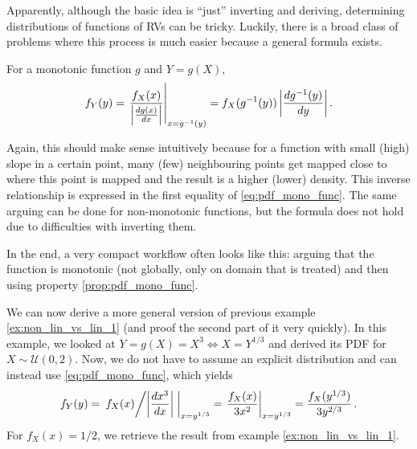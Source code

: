 Apparently, although the basic idea is \enquote{just} inverting and deriving, determining distributions of functions of RVs can be tricky. Luckily, there is a broad class of problems where this process is much easier because a general formula exists.
\begin{prop}\label{prop:pdf_mono_func}
For a monotonic function $g$ and $Y = g(X)$,
\begin{equation}\label{eq:pdf_mono_func}
f_Y(y) = \eval{\frac{f_X(x)}{\abs{\dv{g(x)}{x}}}}_{x = g^{-1}(y)} = f_X(g^{-1}(y)) \, \abs{\dv{g^{-1}(y)}{y}} \, .
\end{equation}
\end{prop}
Again, this should make sense intuitively because for a function with small (high) slope in a certain point, many (few) neighbouring points get mapped close to where this point is mapped and the result is a higher (lower) density. This inverse relationship is expressed in the first equality of \eqref{eq:pdf_mono_func}. The same arguing can be done for non-monotonic functions, but the formula does not hold due to difficulties with inverting them.

In the end, a very compact workflow often looks like this: arguing that the function is monotonic (not globally, only on domain that is treated) and then using property \ref{prop:pdf_mono_func}.\\



\begin{ex}
We can now derive a more general version of previous example \ref{ex:non_lin_vs_lin_1} (and proof the second part of it very quickly). In this example, we looked at $Y = g(X) = X^3 \Leftrightarrow X = Y^{1 / 3}$ and derived its PDF for $X \sim \mathcal{U}(0, 2)$. Now, we do not have to assume an explicit distribution and can instead use \eqref{eq:pdf_mono_func}, which yields
\begin{equation*}
f_Y(y) = \eval{\flatfrac{f_X(x)}{\abs{\dv{x^3}{x}}}}_{x = y^{1 / 3}} = \eval{\frac{f_X(x)}{3 x^2}}_{x = y^{1 / 3}} = \frac{f_X(y^{1 / 3})}{3 y^{2 / 3}} \, .
\end{equation*}
For $f_X(x) = 1 / 2$, we retrieve the result from example \ref{ex:non_lin_vs_lin_1}.
\end{ex}




